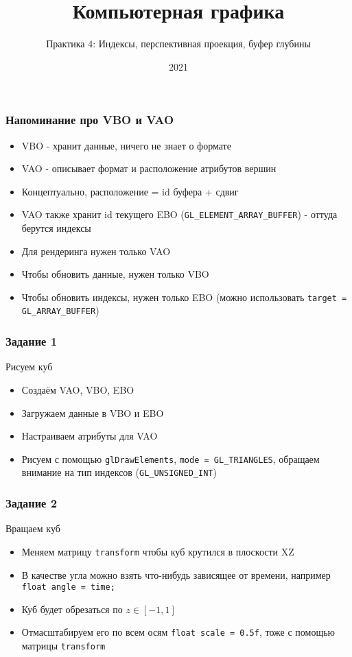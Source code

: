 \documentclass{beamer}
\title{Компьютерная графика}
\subtitle{Практика 4: Индексы, перспективная проекция, буфер глубины}
\date{2021}
\begin{document}
\frame{\titlepage}

\begin{frame}[fragile]
\frametitle{Напоминание про VBO и VAO}
\begin{itemize}
\item VBO - хранит данные, ничего не знает о формате
\item VAO - описывает формат и расположение атрибутов вершин
\item Концептуально, расположение = id буфера + сдвиг
\item VAO также хранит id текущего EBO (\verb|GL_ELEMENT_ARRAY_BUFFER|) - оттуда берутся индексы
\item Для рендеринга нужен только VAO
\item Чтобы обновить данные, нужен только VBO
\item Чтобы обновить индексы, нужен только EBO (можно использовать \verb|target = GL_ARRAY_BUFFER|)
\end{itemize}
\end{frame}

\begin{frame}[fragile]
\frametitle{Задание 1}
Рисуем куб
\begin{itemize}
\item Создаём VAO, VBO, EBO
\pause
\item Загружаем данные в VBO и EBO
\pause
\item Настраиваем атрибуты для VAO
\pause
\item Рисуем с помощью \verb|glDrawElements|, \verb|mode = GL_TRIANGLES|, обращаем внимание на тип индексов (\verb|GL_UNSIGNED_INT|)
\end{itemize}
\end{frame}

\begin{frame}[fragile]
\frametitle{Задание 2}
Вращаем куб
\begin{itemize}
\item Меняем матрицу \verb|transform| чтобы куб крутился в плоскости XZ
\pause
\item В качестве угла можно взять что-нибудь зависящее от времени, например \verb|float angle = time;|
\pause
\item Куб будет обрезаться по \begin{math}z \in [-1, 1]\end{math}
\pause
\item Отмасштабируем его по всем осям \verb|float scale = 0.5f|, тоже с помощью матрицы \verb|transform|
\end{itemize}
\end{frame}
\end{document}
